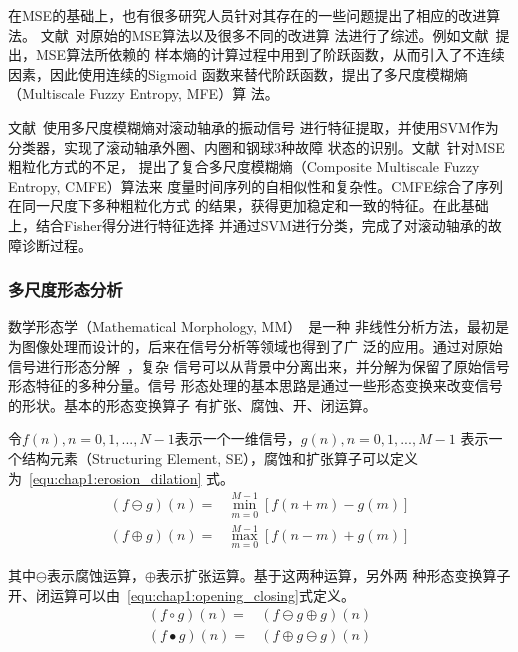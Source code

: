 在MSE的基础上，也有很多研究人员针对其存在的一些问题提出了相应的改进算法。
文献~对原始的MSE算法以及很多不同的改进算
法进行了综述。例如文献~提出，MSE算法所依赖的
样本熵的计算过程中用到了阶跃函数，从而引入了不连续因素，因此使用连续的Sigmoid
函数来替代阶跃函数，提出了多尺度模糊熵（Multiscale Fuzzy Entropy, MFE）算
法。

文献~使用多尺度模糊熵对滚动轴承的振动信号
进行特征提取，并使用SVM作为分类器，实现了滚动轴承外圈、内圈和钢球3种故障
状态的识别。文献~针对MSE粗粒化方式的不足，
提出了复合多尺度模糊熵（Composite Multiscale Fuzzy Entropy, CMFE）算法来
度量时间序列的自相似性和复杂性。CMFE综合了序列在同一尺度下多种粗粒化方式
的结果，获得更加稳定和一致的特征。在此基础上，结合Fisher得分进行特征选择
并通过SVM进行分类，完成了对滚动轴承的故障诊断过程。

\subsubsection{多尺度形态分析}

数学形态学（Mathematical Morphology, MM）~\cite{haralick1987image}是一种
非线性分析方法，最初是为图像处理而设计的，后来在信号分析等领域也得到了广
泛的应用。通过对原始信号进行形态分解~\cite{pitas1990morphological}，复杂
信号可以从背景中分离出来，并分解为保留了原始信号形态特征的多种分量。信号
形态处理的基本思路是通过一些形态变换来改变信号的形状。基本的形态变换算子
有扩张、腐蚀、开、闭运算。

令$f(n), n={0, 1, ..., N-1}$表示一个一维信号，$g(n), n={0, 1, ..., M-1}$
表示一个结构元素（Structuring Element, SE），腐蚀和扩张算子可以定义为~\ref{equ:chap1:erosion_dilation}
式。
\begin{equation}
  \label{equ:chap1:erosion_dilation}
  \begin{aligned}
    (f\ominus g)(n) = & \min_{m=0}^{M-1}\left[f(n+m)-g(m)\right] \\
    (f\oplus g)(n) = & \max_{m=0}^{M-1}\left[f(n-m)+g(m)\right]
  \end{aligned}
\end{equation}

其中$\ominus$表示腐蚀运算，$\oplus$表示扩张运算。基于这两种运算，另外两
种形态变换算子开、闭运算可以由~\ref{equ:chap1:opening_closing}式定义。
\begin{equation}
  \label{equ:chap1:opening_closing}
  \begin{aligned}
    (f\circ g)(n) = & (f\ominus g\oplus g)(n) \\
    (f\bullet g)(n) = & (f\oplus g\ominus g)(n)
  \end{aligned}
\end{equation}

